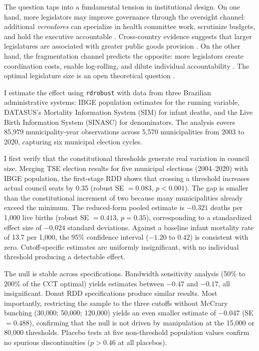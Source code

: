 \documentclass[12pt]{article}
\begin{document}
The question taps into a fundamental tension in institutional design. On one hand, more legislators may improve governance through the oversight channel: additional \textit{vereadores} can specialize in health committee work, scrutinize budgets, and hold the executive accountable \citep{persson2000political}. Cross-country evidence suggests that larger legislatures are associated with greater public goods provision \citep{besley2004does}. On the other hand, the fragmentation channel predicts the opposite: more legislators create coordination costs, enable log-rolling, and dilute individual accountability \citep{weingast1981political}. The optimal legislature size is an open theoretical question \citep{stigler1976sizes}.

I estimate the effect using \texttt{rdrobust} \citep{calonico2014robust} with data from three Brazilian administrative systems: IBGE population estimates for the running variable, DATASUS's Mortality Information System (SIM) for infant deaths, and the Live Birth Information System (SINASC) for denominators. The analysis covers 85,979 municipality-year observations across 5,570 municipalities from 2003 to 2020, capturing six municipal election cycles.

I first verify that the constitutional thresholds generate real variation in council size. Merging TSE election results for five municipal elections (2004--2020) with IBGE population, the first-stage RDD shows that crossing a threshold increases actual council seats by 0.35 (robust SE $= 0.083$, $p < 0.001$). The gap is smaller than the constitutional increment of two because many municipalities already exceed the minimum. The reduced-form pooled estimate is $-0.321$ deaths per 1,000 live births (robust SE $= 0.413$, $p = 0.35$), corresponding to a standardized effect size of $-0.024$ standard deviations. Against a baseline infant mortality rate of 13.7 per 1,000, the 95\% confidence interval ($-1.20$ to $0.42$) is consistent with zero. Cutoff-specific estimates are uniformly insignificant, with no individual threshold producing a detectable effect.

The null is stable across specifications. Bandwidth sensitivity analysis (50\% to 200\% of the CCT optimal) yields estimates between $-0.47$ and $-0.17$, all insignificant. Donut RDD specifications produce similar results. Most importantly, restricting the sample to the three cutoffs without McCrary bunching (30,000; 50,000; 120,000) yields an even smaller estimate of $-0.047$ (SE $= 0.488$), confirming that the null is not driven by manipulation at the 15,000 or 80,000 thresholds. Placebo tests at five non-threshold population values confirm no spurious discontinuities ($p > 0.46$ at all placebos).
\end{document}
